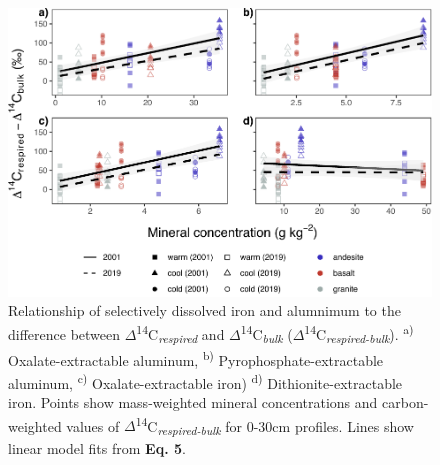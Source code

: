 \documentclass[english,man,floatsintext]{apa6}
\begin{document}
\begin{figure}

{\centering \includegraphics{sra-blk-inc-SI_files/figure-latex/min-all-blk-inc-plot-1} 

}

\caption{Relationship of selectively dissolved iron and alumnimum to the difference between \(\Delta\)\textsuperscript{14}C\textsubscript{\emph{respired}} and \(\Delta\)\textsuperscript{14}C\textsubscript{\emph{bulk}} (\(\Delta\)\textsuperscript{14}C\textsubscript{\emph{respired-bulk}}). \textsuperscript{a)} Oxalate-extractable aluminum, \textsuperscript{b)} Pyrophosphate-extractable aluminum, \textsuperscript{c)} Oxalate-extractable iron) \textsuperscript{d)} Dithionite-extractable iron. Points show mass-weighted mineral concentrations and carbon-weighted values of \(\Delta\)\textsuperscript{14}C\textsubscript{\emph{respired-bulk}} for 0-30cm profiles. Lines show linear model fits from \textbf{Eq. 5}.}\label{fig:min-all-blk-inc-plot}
\end{figure}
\end{document}
